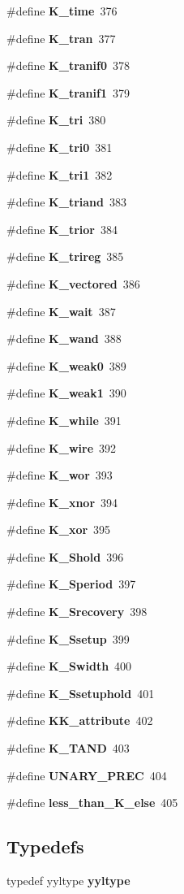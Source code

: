\begin{CompactItemize}
\#define {\bf K\_\-time}\ 376
\item 
\#define {\bf K\_\-tran}\ 377
\item 
\#define {\bf K\_\-tranif0}\ 378
\item 
\#define {\bf K\_\-tranif1}\ 379
\item 
\#define {\bf K\_\-tri}\ 380
\item 
\#define {\bf K\_\-tri0}\ 381
\item 
\#define {\bf K\_\-tri1}\ 382
\item 
\#define {\bf K\_\-triand}\ 383
\item 
\#define {\bf K\_\-trior}\ 384
\item 
\#define {\bf K\_\-trireg}\ 385
\item 
\#define {\bf K\_\-vectored}\ 386
\item 
\#define {\bf K\_\-wait}\ 387
\item 
\#define {\bf K\_\-wand}\ 388
\item 
\#define {\bf K\_\-weak0}\ 389
\item 
\#define {\bf K\_\-weak1}\ 390
\item 
\#define {\bf K\_\-while}\ 391
\item 
\#define {\bf K\_\-wire}\ 392
\item 
\#define {\bf K\_\-wor}\ 393
\item 
\#define {\bf K\_\-xnor}\ 394
\item 
\#define {\bf K\_\-xor}\ 395
\item 
\#define {\bf K\_\-Shold}\ 396
\item 
\#define {\bf K\_\-Speriod}\ 397
\item 
\#define {\bf K\_\-Srecovery}\ 398
\item 
\#define {\bf K\_\-Ssetup}\ 399
\item 
\#define {\bf K\_\-Swidth}\ 400
\item 
\#define {\bf K\_\-Ssetuphold}\ 401
\item 
\#define {\bf KK\_\-attribute}\ 402
\item 
\#define {\bf K\_\-TAND}\ 403
\item 
\#define {\bf UNARY\_\-PREC}\ 404
\item 
\#define {\bf less\_\-than\_\-K\_\-else}\ 405
\end{CompactItemize}
\subsection*{Typedefs}
\begin{CompactItemize}
\item 
typedef yyltype {\bf yyltype}
\end{CompactItemize}
